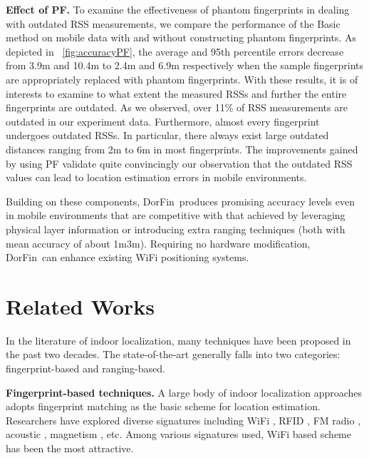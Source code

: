\documentclass[10pt,conference,compsocconf,letterpaper]{./sty/IEEEtran}
\newcommand{\empha}[1]{{\bf #1}}
\def\sysname{DorFin}
\begin{document}
\empha{Effect of PF.}
To examine the effectiveness of phantom fingerprints in dealing with outdated RSS measurements, we compare the performance of the Basic method on mobile data with and without constructing phantom fingerprints.
As depicted in \figurename~\ref{fig:accuracyPF}, the average and 95th percentile errors decrease from 3.9m and 10.4m to 2.4m and 6.9m respectively when the sample fingerprints are appropriately replaced with phantom fingerprints.
With these results, it is of interests to examine to what extent the measured RSSs and further the entire fingerprints are outdated. As we observed, over 11\% of RSS measurements are outdated in our experiment data. Furthermore, almost every fingerprint undergoes outdated RSSs. In particular, there always exist large outdated distances ranging from 2m to 6m in most fingerprints. The improvements gained by using PF validate quite convincingly our observation that the outdated RSS values can lead to location estimation errors in mobile environments.

Building on these components, \sysname~produces promising accuracy levels even in mobile environments that are competitive with that achieved by leveraging physical layer information \cite{sen_you_2012, sen2013avoid} or introducing extra ranging techniques \cite{nandakumar_centaur_2012, liu_push_2012} (both with mean accuracy of about 1m3m). Requiring no hardware modification, \sysname~can enhance existing WiFi positioning systems.









\section{Related Works}
\label{sec:related-works}

In the literature of indoor localization, many techniques have been proposed in the past two decades. The state-of-the-art generally falls into two categories: fingerprint-based and ranging-based.

\textbf{Fingerprint-based techniques.} A large body of indoor localization approaches adopts fingerprint matching as the basic scheme for location estimation. Researchers have explored diverse signatures including WiFi \cite{youssef_horus_2005}, RFID \cite{ni_landmarc_2004}, FM radio \cite{Yoon2013FM}, acoustic \cite{tarzia_indoor_2011}, magnetism \cite{chung_indoor_2011}, etc. Among various signatures used, WiFi based scheme has been the most attractive. 
\end{document}
